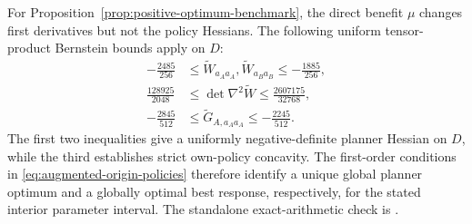 For Proposition~\ref{prop:positive-optimum-benchmark}, the direct
benefit $\mu$ changes first derivatives but not the policy Hessians.
The following uniform tensor-product Bernstein bounds apply on $D$:
\begin{align*}
-\frac{2485}{256}
&\leq\widetilde W_{a_Aa_A},\widetilde W_{a_Ba_B}
\leq-\frac{1885}{256},\\
\frac{128925}{2048}
&\leq \det\nabla^2\widetilde W
\leq\frac{2607175}{32768},\\
-\frac{2845}{512}
&\leq\widetilde G_{A,a_Aa_A}
\leq-\frac{2245}{512}.
\end{align*}
The first two inequalities give a uniformly negative-definite
planner Hessian on $D$, while the third establishes strict
own-policy concavity. The first-order conditions in
\eqref{eq:augmented-origin-policies} therefore identify a unique
global planner optimum and a globally optimal best response,
respectively, for the stated interior parameter interval. The
standalone exact-arithmetic check is
.
